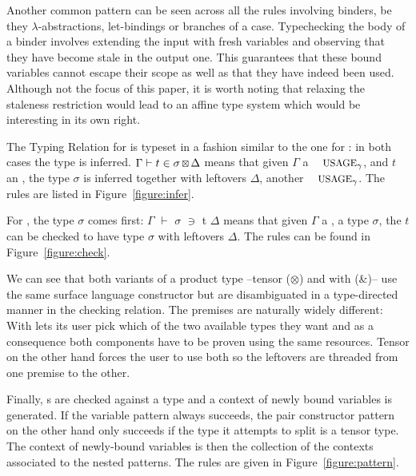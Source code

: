 Another common pattern can be seen across all the rules involving
binders, be they \ensuremath{\lambda}-abstractions, let-bindings or branches of a
case. Typechecking the body of a binder involves extending the
input \Usages{} with fresh variables and observing that they have
become stale in the output one. This guarantees that these bound
variables cannot escape their scope as well as that they have indeed
been used. Although not the focus of this paper, it is worth noting
that relaxing the staleness restriction would lead to an affine
type system which would be interesting in its own right.

\begin{definition}The Typing Relation for \Inferable{} is typeset
in a fashion similar to the one for \Var{}: in both cases
the type is inferred. $\Gamma \vdash t \in \sigma \,{\scriptstyle \boxtimes{}}\,{} \Delta$ means that given \ensuremath{\Gamma} a
$\Usages{\ensuremath{\gamma}}$, and $t$ an \Inferable{}, the type \ensuremath{\sigma} is inferred
together with leftovers \ensuremath{\Delta}, another $\Usages{\ensuremath{\gamma}}$. The rules are
listed in Figure~\ref{figure:infer}.
\end{definition}



\begin{definition}For \Checkable{}, the type \ensuremath{\sigma} comes first: \ensuremath{\Gamma} \ensuremath{\vdash} \ensuremath{\sigma} \ensuremath{\ni} t \andalso{} \ensuremath{\Delta} means
that given \ensuremath{\Gamma} a \Usages{\ensuremath{\gamma}}, a type \ensuremath{\sigma}, the \Checkable{} $t$ can
be checked to have type \ensuremath{\sigma} with leftovers \ensuremath{\Delta}. The rules can be found
in Figure~\ref{figure:check}.
\end{definition}



We can see that both variants of a product type --tensor (\ensuremath{\otimes}) and
with (\&)-- use the same surface language constructor but are
disambiguated in a type-directed manner in the checking relation.
The premises are naturally widely different: With lets its user
pick which of the two available types they want and as a consequence
both components have to be proven using the same resources. Tensor
on the other hand forces the user to use both so the leftovers
are threaded from one premise to the other.

\begin{definition}
Finally, \Pattern{}s are checked against a type and a context of
newly bound variables is generated. If the variable pattern always
succeeds, the pair constructor pattern on the other hand
only succeeds if the type it attempts to split is a tensor type.
The context of newly-bound variables is then the collection of the
contexts associated to the nested patterns. The rules are given in
Figure~\ref{figure:pattern}.
\end{definition}

